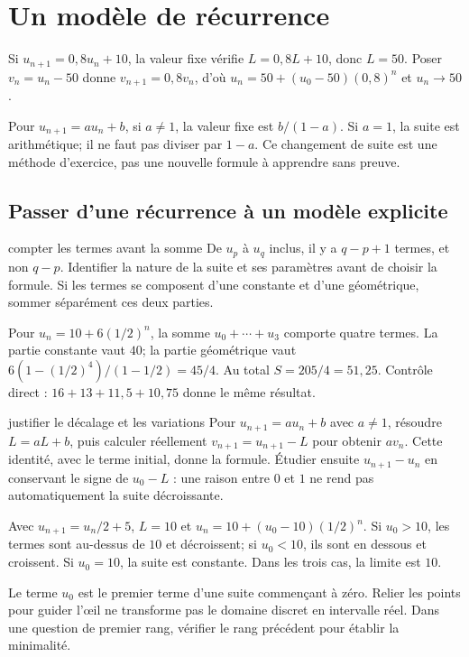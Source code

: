 \section{Un modèle de récurrence}
\begin{exemple}
Si $u_{n+1}=0{,}8u_n+10$, la valeur fixe vérifie $L=0{,}8L+10$, donc $L=50$. Poser $v_n=u_n-50$ donne $v_{n+1}=0{,}8v_n$, d’où $u_n=50+(u_0-50)(0{,}8)^n$ et $u_n\to50$.
\end{exemple}
\begin{remarque}Pour $u_{n+1}=au_n+b$, si $a\ne1$, la valeur fixe est $b/(1-a)$. Si $a=1$, la suite est arithmétique; il ne faut pas diviser par $1-a$. Ce changement de suite est une méthode d’exercice, pas une nouvelle formule à apprendre sans preuve.\end{remarque}


\subsection*{Passer d’une récurrence à un modèle explicite}
\begin{methode}{compter les termes avant la somme}
De $u_p$ à $u_q$ inclus, il y a $q-p+1$ termes, et non $q-p$. Identifier la nature de la suite et ses paramètres avant de choisir la formule. Si les termes se composent d’une constante et d’une géométrique, sommer séparément ces deux parties.
\end{methode}
\begin{exemple}
Pour $u_n=10+6(1/2)^n$, la somme $u_0+\cdots+u_3$ comporte quatre termes. La partie constante vaut $40$; la partie géométrique vaut $6(1-(1/2)^4)/(1-1/2)=45/4$. Au total $S=205/4=51{,}25$. Contrôle direct : $16+13+11{,}5+10{,}75$ donne le même résultat.
\end{exemple}
\begin{methode}{justifier le décalage et les variations}
Pour $u_{n+1}=au_n+b$ avec $a\ne1$, résoudre $L=aL+b$, puis calculer réellement $v_{n+1}=u_{n+1}-L$ pour obtenir $av_n$. Cette identité, avec le terme initial, donne la formule. Étudier ensuite $u_{n+1}-u_n$ en conservant le signe de $u_0-L$ : une raison entre $0$ et $1$ ne rend pas automatiquement la suite décroissante.
\end{methode}
\begin{exemple}
Avec $u_{n+1}=u_n/2+5$, $L=10$ et $u_n=10+(u_0-10)(1/2)^n$. Si $u_0>10$, les termes sont au-dessus de $10$ et décroissent; si $u_0<10$, ils sont en dessous et croissent. Si $u_0=10$, la suite est constante. Dans les trois cas, la limite est $10$.
\end{exemple}
\begin{avertissement}
Le terme $u_0$ est le premier terme d’une suite commençant à zéro. Relier les points pour guider l’œil ne transforme pas le domaine discret en intervalle réel. Dans une question de premier rang, vérifier le rang précédent pour établir la minimalité.
\end{avertissement}


